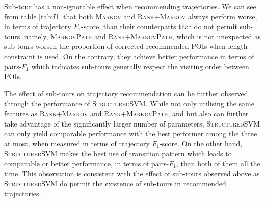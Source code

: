 Sub-tour has a non-ignorable effect when recommending trajectories.
We can see from table \ref{tab:f1} that both \textsc{Markov} and \textsc{Rank+Markov} always perform worse,
in terms of trajectory $F_1$-score, than
their counterparts that do not permit sub-tours, namely, \textsc{MarkovPath} and \textsc{Rank+MarkovPath},
which is not unexpected as sub-tours worsen the proportion of corrected
recommended POIs when length constraint is used.
On the contrary, they achieve better performance in terms of pairs-$F_1$ which indicates sub-tours generally
respect the visiting order between POIs.

The effect of sub-tours on trajectory recommendation can be further observed through the performance of \textsc{StructuredSVM}.
%
While not only utilising the same features as \textsc{Rank+Markov} and \textsc{Rank+MarkovPath},
and but also can further take advantage of the significantly larger number of parameters,
\textsc{StructuredSVM} can only yield comparable performance with the best performer 
among the three at most, when measured in terms of trajectory $F_1$-score.
On the other hand, \textsc{StructuredSVM} makes the best use of transition pattern which leads to comparable or
better performance, in terms of pairs-$F_1$, than both of them all the time.
This observation is consistent with the effect of sub-tours observed above
as \textsc{StructuredSVM} do permit the existence of sub-tours in recommended trajectories.

